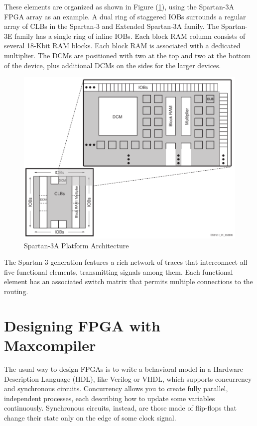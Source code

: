 These elements are organized as shown in Figure (\ref{fig:spartan_arch}),
using the Spartan-3A FPGA
array as an example. A dual ring of staggered IOBs surrounds a regular
array of CLBs in the Spartan-3 and Extended Spartan-3A family. The
Spartan-3E family has a single ring of inline IOBs. Each block RAM column
consists of several 18-Kbit RAM blocks. Each block RAM is associated with a
dedicated multiplier. The DCMs are positioned with two at the top and two
at the bottom of the device, plus additional DCMs on the sides for the
larger devices.

\begin{figure}[h]
  \centering
  \includegraphics[scale=0.3]{img/spartan_arch.png}
  \caption{Spartan-3A Platform Architecture}
  \label{fig:spartan_arch}
\end{figure}

The Spartan-3 generation features a rich network of traces that
interconnect all five functional elements, transmitting signals among them.
Each functional element has an associated switch matrix that permits
multiple connections to the routing\cite{fpgaug}.

\section{Designing FPGA with Maxcompiler}

The usual way to design FPGAs is to write a behavioral model in
a Hardware Description Language (HDL), like Verilog or VHDL, which
supports concurrency and synchronous circuits. Concurrency allows
you to create fully parallel, independent processes, each describing
how to update some variables continuously. Synchronous circuits, instead,
are those made of flip-flops that change their state only on the edge
of some clock signal.

